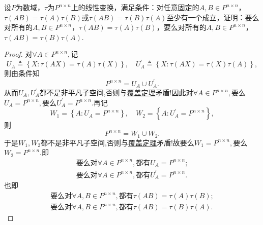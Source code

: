 \documentclass[../../main.tex]{subfiles}
\begin{document}
\begin{example}
设\( P \)为数域，\( \tau \)为\( P^{n \times n} \)上的线性变换，满足条件：对任意固定的\( A, B \in P^{n \times n} \)，\( \tau(AB) = \tau(A)\tau(B) \)或\( \tau(AB) = \tau(B)\tau(A) \)至少有一个成立，证明：要么对所有的\( A, B \in P^{n \times n} \)，\( \tau(AB) = \tau(A)\tau(B) \)，要么对所有的\( A, B \in P^{n \times n} \)，\( \tau(AB) = \tau(B)\tau(A) \).
\end{example}
\begin{proof}
对$\forall A\in P^{n\times n},$记
$$U_A\triangleq \left\{ X:\tau \left( AX \right) =\tau \left( A \right) \tau \left( X \right) \right\}, \quad U_{A}^{\prime}\triangleq \left\{ X:\tau \left( AX \right) =\tau \left( X \right) \tau \left( A \right) \right\},$$
则由条件知
$$P^{n\times n}=U_A\cup U_{A}^{\prime}.$$
从而$U_A,U_{A}^{\prime}$都不是非平凡子空间,否则与\hyperref[theorem:覆盖定理]{覆盖定理}矛盾!因此对$\forall A\in P^{n\times n},$要么$U_A=P^{n\times n},$要么$U_{A}^{\prime}=P^{n\times n}.$再记
$$W_1=\left\{ A:U_A=P^{n\times n} \right\}, \quad W_2=\left\{ A:U_{A}^{\prime}=P^{n\times n} \right\},$$
则
$$P^{n\times n}=W_1\cup W_2.$$
于是$W_1,W_2$都不是非平凡子空间,否则与\hyperref[theorem:覆盖定理]{覆盖定理}矛盾!故要么$W_1=P^{n\times n},$要么$W_2=P^{n\times n}.$即
\begin{align*}
\text{要么对}\forall A\in P^{n\times n},\text{都有}U_A=P^{n\times n};
\\
\text{要么对}\forall A\in P^{n\times n},\text{都有}U_{A}^{\prime}=P^{n\times n}.
\end{align*}
也即
\begin{align*}
\text{要么对}\forall A,B\in P^{n\times n},\text{都有}\tau \left( AB \right) =\tau \left( A \right) \tau \left( B \right) ;
\\
\text{要么对}\forall A,B\in P^{n\times n},\text{都有}\tau \left( AB \right) =\tau \left( B \right) \tau \left( A \right) .
\end{align*}
\end{proof}
\end{document}
